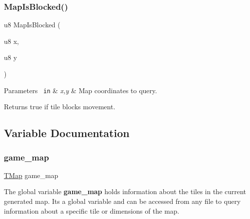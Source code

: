 \subsubsection{\texorpdfstring{MapIsBlocked()}{MapIsBlocked()}}
{\footnotesize\ttfamily u8 Map\+Is\+Blocked (\begin{DoxyParamCaption}\item[{u8}]{x,  }\item[{u8}]{y }\end{DoxyParamCaption})}


\begin{DoxyParams}[1]{Parameters}
\mbox{\texttt{ in}}  & {\em x,y} & Map coordinates to query.\\
\hline
\end{DoxyParams}
\begin{DoxyReturn}{Returns}
true if tile blocks movement. 
\end{DoxyReturn}


\subsection{Variable Documentation}
\mbox{\label{group__GameMap_ga6c049bed6e4286fab8db7b65f4d8f871}} 
\subsubsection{\texorpdfstring{game\_map}{game\_map}}
{\footnotesize\ttfamily \mbox{\hyperlink{structTMap}{T\+Map}} game\+\_\+map}

The global variable {\bfseries{game\+\_\+map}} holds information about the tiles in the current generated map. It\textquotesingle{}s a global variable and can be accessed from any file to query information about a specific tile or dimensions of the map. 